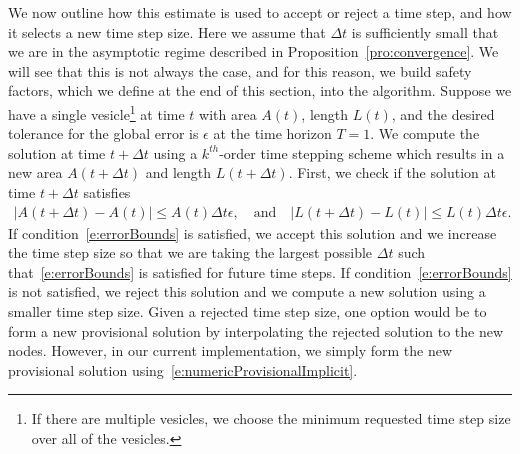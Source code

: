 We now outline how this estimate is used to accept or reject a time
step, and how it selects a new time step size.  Here we assume that
$\Delta t$ is sufficiently small that we are in the asymptotic regime
described in Proposition~\ref{pro:convergence}.  We will see that this
is not always the case, and for this reason, we build safety factors,
which we define at the end of this section, into the algorithm.  Suppose
we have a single vesicle\footnote{If there are multiple vesicles, we
choose the minimum requested time step size over all of the vesicles.}
at time $t$ with area $A(t)$, length $L(t)$, and the desired tolerance
for the global error is $\epsilon$ at the time horizon $T=1$.  We
compute the solution at time $t+\Delta t$ using a $k^{th}$-order time
stepping scheme which results in a new area $A(t + \Delta t)$ and length
$L(t + \Delta t)$.  First, we check if the solution at time $t + \Delta
t$ satisfies
\begin{align}
  |A(t+\Delta t) - A(t)| \leq A(t) \Delta t \epsilon,
  \quad \text{and} \quad
  |L(t+\Delta t) - L(t)| \leq L(t) \Delta t \epsilon.
  \label{e:errorBounds}
\end{align}
If condition~\eqref{e:errorBounds} is satisfied, we accept this
solution and we increase the time step size so that we are taking the
largest possible $\Delta t$ such that~\eqref{e:errorBounds} is
satisfied for future time steps.  If condition~\eqref{e:errorBounds} is
not satisfied, we reject this solution and we compute a new solution
using a smaller time step size.  Given a rejected time step size, one
option would be to form a new provisional solution by interpolating the
rejected solution to the new nodes.  However, in our current
implementation, we simply form the new provisional solution
using~\eqref{e:numericProvisionalImplicit}.

